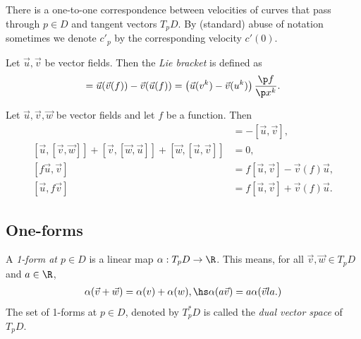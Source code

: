 \documentclass{article}
\begin{document}
\begin{corollary}
    There is a one-to-one correspondence between velocities of curves that pass through
    $p\in D$ and tangent vectors $T_pD$. By (standard) abuse of notation sometimes
    we denote $c'_p$ by the corresponding velocity $c'(0)$.
\end{corollary}

\begin{definition}
    Let $\vec u,\vec v$ be vector fields. Then the \emph{Lie bracket} is defined as
    \begin{align*}
        [\vec u, \vec v] = \vec u(\vec v(f)) - \vec v(\vec u(f))
        = \left(\vec u(v^k)-\vec v(u^k)\right)\frac{\p f}{\p x^k}.
    \end{align*}
\end{definition}

\begin{lemma}
    Let $\vec u, \vec v, \vec w$ be vector fields and let $f$ be a
    function. Then
    \begin{align*}
        [\vec v, \vec u]                                                                     & = -[\vec u, \vec v],                \\
        [\vec u, [\vec v, \vec w]] + [\vec v, [\vec w, \vec u]] + [\vec w, [\vec u, \vec v]] & = 0,                                \\
        [f\vec u, \vec v]                                                                    & = f[\vec u,\vec v]-\vec v(f)\vec u, \\
        [\vec u, f\vec v]                                                                    & = f[\vec u,\vec v]+\vec v(f)\vec u.
    \end{align*}
\end{lemma}

\subsection{One-forms}

\begin{definition}
    A \emph{1-form at $p\in D$} is a linear map $\alpha:T_pD \to \R$. This means, for all
    $\vec v, \vec w\in T_pD$ and $a\in\R$,
    \begin{align*}
        \alpha(\vec v + \vec w) = \alpha(v) + \alpha(w),\hs \alpha(a\vec v) = a\alpha(\vec v    la.)
    \end{align*}
    The set of 1-forms at $p\in D$, denoted by $T^*_p D$ is called the \emph{dual vector space}
    of $T_p D$.
\end{definition}
\end{document}
